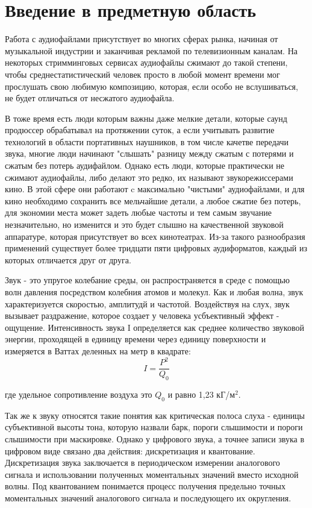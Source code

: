 \documentclass[12pt,a4paper,oneside]{report}
\begin{document}
\section{Введение в предметную область}
\quad
Работа с аудиофайлами присутствует во многих сферах рынка, начиная от музыкальной индустрии и заканчивая рекламой по телевизионным каналам. На некоторых стримминговых сервисах аудиофайлы сжимают до такой степени, чтобы среднестатистический человек просто в любой момент времени мог прослушать свою любимую композицию, которая, если особо не вслушиваться, не будет отличаться от несжатого аудиофайла. 

В тоже время есть люди которым важны даже мелкие детали, которые саунд продюссер обрабатывал на протяжении суток, а если учитывать развитие технологий в области портативных наушников, в том числе качетве передачи звука, многие люди начинают "слышать" разницу между сжатым с потерями и сжатым без потерь аудифайлом. Однако есть люди, которые практически не сжимают аудиофайлы, либо делают это редко, их называют звукорежиссерами кино. В этой сфере они работают c максимально "чистыми" аудиофайлами, и для кино необходимо сохранить все мельчайшие детали, а любое сжатие без потерь, для экономии места может задеть любые частоты и тем самым звучание незначительно, но изменится и это будет слышно на качественной звуковой аппаратуре, которая присутствует во всех кинотеатрах. Из-за такого разнообразия применений существует более тридцати пяти цифровых аудиформатов, каждый из которых отличается друг от друга. 
\quad

Звук - это упругое колебание среды, он распространяется в среде с помощью волн давления посредством колебния атомов и молекул. Как и любая волна, звук характеризуется скоростью, амплитудй и частотой. Воздействуя на слух, звук вызывает раздражение, которое создает у человека усбъективный эффект - ощущение\cite{seven}. Интенсивность звука I определяется как среднее количество звуковой энергии, проходящей в единицу времени через единицу поверхности и измеряется в Ваттах деленных на метр в квадрате:
\begin{equation}
	I = \frac{P^2}{Q_0}
	\label{eq:ref}
\end{equation}

где удельное сопротивление воздуха это $Q_0$ и равно 1,23 кГ/$м^2$.


Так же к звуку относятся такие понятия как критическая полоса слуха - единицы субъективной высоты тона, которую назвали барк, пороги слышимости и пороги слышимости при маскировке\cite{thourty}. Однако у цифрового звука, а точнее записи звука в цифровом виде связано два действия: дискретизация и квантование. Дискретизация звука заключается в периодическом измерении аналогового сигнала и использовании полученных моментальных значений вместо исходной волны. Под квантованием понимается процесс получения предельно точных моментальных значений аналогового сигнала и последующего их округления.
\end{document}
